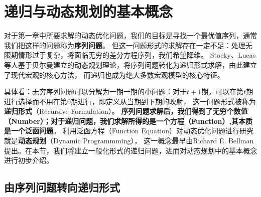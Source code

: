 
\section{递归与动态规划的基本概念}  \label{sec-fe-dp-concept}

对于第一章中所要求解的动态优化问题，我们的目标是寻找一个最优值序列，通常我们把这样的问题称为\textbf{序列问题}。
但这一问题形式的求解存在一定不足：处理无限期情形过于复杂，将面临无穷的差分方程序列，我们希望降维。
Stocky、Lucas等人基于贝尔曼建立的动态规划理论，将序列问题转化为递归形式求解，由此建立了现代宏观的核心方法，
而递归也成为绝大多数宏观模型的核心特征。

具体看：无穷序列问题可以分解为一期一期的小问题：对于$t+1$期，可以在第$t$期进行选择而不用在第0期进行，即定义从当期到下期的映射，
这一问题形式被称为\textbf{递归形式}（Recursive Formulation）。
\textbf{序列问题求解后，我们得到了无穷个数值（Number）；对于递归问题，我们求解所得的是一个方程（Function）,其本质是一个泛函问题}。
利用泛函方程（Function Equation）对动态优化问题进行研究就是\textbf{动态规划}（Dynamic Programmming），
这一概念最早由Richard E. Bellman提出。在本节，我们将建立一般化形式的递归问题，进而对动态规划中的基本概念进行初步介绍。


\subsection{由序列问题转向递归形式}

